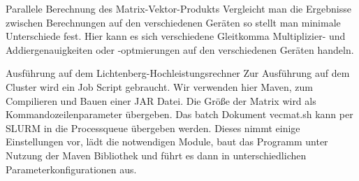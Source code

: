 \documentclass[
ngerman,
subtask=ruled %
]{tudaexercise}
\begin{document}
\begin{task}{Parallele Berechnung des Matrix-Vektor-Produkts}
		Vergleicht man die Ergebnisse zwischen Berechnungen auf den verschiedenen Geräten so stellt man minimale Unterschiede fest. 
		Hier kann es sich verschiedene Gleitkomma Multiplizier- und Addiergenauigkeiten oder -optmierungen auf den verschiedenen Geräten handeln. 
	\end{task}
	
	
	\begin{task}{Ausführung auf dem Lichtenberg-Hochleistungsrechner} 
		Zur Ausführung auf dem Cluster wird ein Job Script gebraucht.
		Wir verwenden hier Maven, zum Compilieren und Bauen einer JAR Datei.
		Die Größe der Matrix wird als Kommandozeilenparameter übergeben.
		Das batch Dokument vecmat.sh kann per SLURM in die Processqueue übergeben werden.
		Dieses nimmt einige Einstellungen vor, lädt die notwendigen Module, baut das Programm unter Nutzung der Maven Bibliothek und führt es dann in unterschiedlichen Parameterkonfigurationen aus.
	\end{task}
\end{document}
